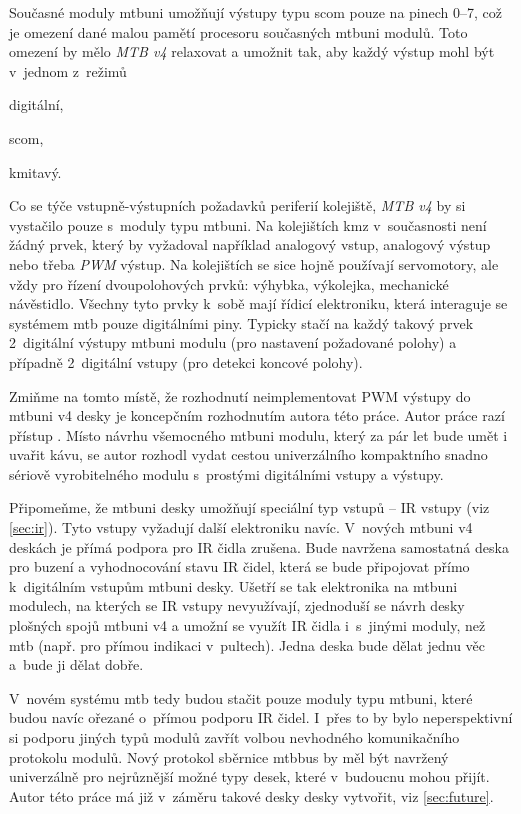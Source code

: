 Současné moduly \gls{mtbuni} umožňují výstupy typu \gls{scom} pouze na pinech
0–7, což je omezení dané malou pamětí procesoru současných \gls{mtbuni} modulů.
Toto omezení by mělo \textit{MTB v4} relaxovat a umožnit tak, aby každý výstup
mohl být v~jednom z~režimů

\begin{compactenum}
\item digitální,
\item \gls{scom},
\item kmitavý.
\end{compactenum}

Co se týče vstupně-výstupních požadavků periferií kolejiště, \textit{MTB v4} by
si vystačilo pouze s~moduly typu \gls{mtbuni}. Na kolejištích \gls{kmz}
v~současnosti není žádný prvek, který by vyžadoval například analogový vstup,
analogový výstup nebo třeba \textit{PWM} výstup. Na kolejištích se sice hojně
používají servomotory, ale vždy pro řízení dvoupolohových prvků: výhybka,
výkolejka, mechanické návěstidlo. Všechny tyto prvky k~sobě mají řídicí
elektroniku, která interaguje se systémem \gls{mtb} pouze digitálními piny.
Typicky stačí na každý takový prvek 2~digitální výstupy \gls{mtbuni} modulu
(pro nastavení požadované polohy) a případně 2~digitální vstupy (pro detekci
koncové polohy).

Zmiňme na tomto místě, že rozhodnutí neimplementovat PWM výstupy do
\gls{mtbuni} v4 desky je koncepčním rozhodnutím autora této práce. Autor práce
razí přístup . Místo návrhu
všemocného \gls{mtbuni} modulu, který za pár let bude umět i uvařit kávu, se
autor rozhodl vydat cestou univerzálního kompaktního snadno sériově
vyrobitelného modulu s~prostými digitálními vstupy a výstupy.

Připomeňme, že \gls{mtbuni} desky umožňují speciální typ vstupů – IR vstupy
(viz \ref{sec:ir}). Tyto vstupy vyžadují další elektroniku navíc.  V~nových
\gls{mtbuni} v4 deskách je přímá podpora pro IR čidla zrušena. Bude navržena
samostatná deska pro buzení a vyhodnocování stavu IR čidel, která se bude
připojovat přímo k~digitálním vstupům \gls{mtbuni} desky. Ušetří se tak
elektronika na \gls{mtbuni} modulech, na kterých se IR vstupy nevyužívají,
zjednoduší se návrh desky plošných spojů \gls{mtbuni} v4 a umožní se využít IR
čidla i~s~jinými moduly, než \gls{mtb} (např. pro přímou indikaci v~pultech).
Jedna deska bude dělat jednu věc a~bude ji dělat dobře.

V~novém systému \gls{mtb} tedy budou stačit pouze moduly typu \gls{mtbuni},
které budou navíc ořezané o~přímou podporu IR čidel. I~přes to by bylo
neperspektivní si podporu jiných typů modulů zavřít volbou nevhodného
komunikačního protokolu modulů. Nový protokol sběrnice \gls{mtbbus} by měl být
navržený univerzálně pro nejrůznější možné typy desek, které v~budoucnu mohou
přijít.  Autor této práce má již v~záměru takové desky desky vytvořit, viz
\ref{sec:future}.

